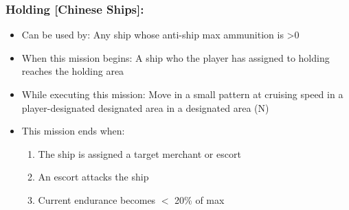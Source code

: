 \documentclass{article}
\begin{document}
    \subsubsection{Holding [Chinese Ships]:}
            \begin{itemize}
                \item{Can be used by:} Any ship whose anti-ship max ammunition is \textgreater 0
                \item{When this mission begins:} A ship who the player has assigned to holding reaches the holding area
                \item{While executing this mission:} Move in a small pattern at cruising speed in a player-designated designated area in a designated area (N)
                \item{This mission ends when:}
                \begin{enumerate}[label=\arabic*)]
                    \item The ship is assigned a target merchant or escort \par 
                    [hunter gains tracking mission on its target]
                    \item An escort attacks the ship \par 
                    [Hunter returns to base, record escort chases off hunter] 
                    \item Current endurance becomes $<$ 20\% of max \par
                    [Hunter gains mission ``Return to Base'']
                \end{enumerate}
            \end{itemize}
            
\end{document}
